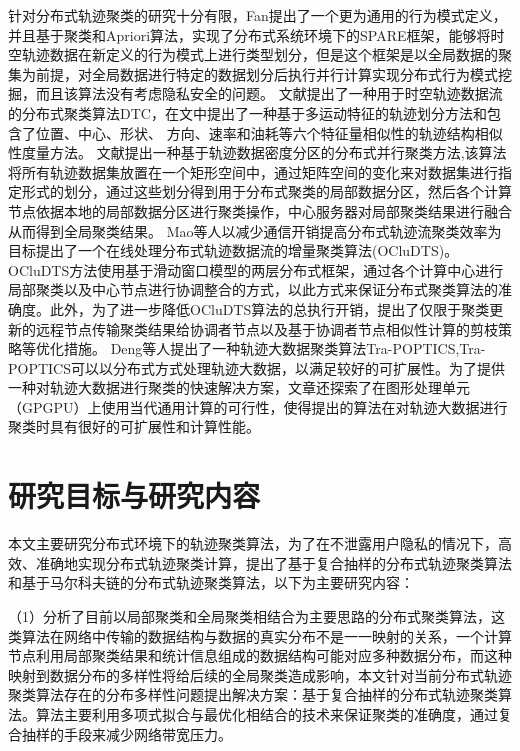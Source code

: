 针对分布式轨迹聚类的研究十分有限，Fan提出了一个更为通用的行为模式定义，并且基于聚类和Apriori算法，实现了分布式系统环境下的SPARE框架，能够将时空轨迹数据在新定义的行为模式上进行类型划分，但是这个框架是以全局数据的聚集为前提，对全局数据进行特定的数据划分后执行并行计算实现分布式行为模式挖掘，而且该算法没有考虑隐私安全的问题。
文献\cite{肖源分布式车辆时空轨迹异常检测算法研究}提出了一种用于时空轨迹数据流的分布式聚类算法DTC，在文中提出了一种基于多运动特征的轨迹划分方法和包含了位置、中心、形状、
方向、速率和油耗等六个特征量相似性的轨迹结构相似性度量方法。
文献\cite{Wang2018A}提出一种基于轨迹数据密度分区的分布式并行聚类方法,该算法将所有轨迹数据集放置在一个矩形空间中，通过矩阵空间的变化来对数据集进行指定形式的划分，通过这些划分得到用于分布式聚类的局部数据分区，然后各个计算节点依据本地的局部数据分区进行聚类操作，中心服务器对局部聚类结果进行融合从而得到全局聚类结果。
Mao等人以减少通信开销提高分布式轨迹流聚类效率为目标提出了一个在线处理分布式轨迹数据流的增量聚类算法(OCluDTS)。OCluDTS方法使用基于滑动窗口模型的两层分布式框架，通过各个计算中心进行局部聚类以及中心节点进行协调整合的方式，以此方式来保证分布式聚类算法的准确度。此外，为了进一步降低OCluDTS算法的总执行开销，提出了仅限于聚类更新的远程节点传输聚类结果给协调者节点以及基于协调者节点相似性计算的剪枝策略等优化措施。
Deng等人提出了一种轨迹大数据聚类算法Tra-POPTICS,Tra-POPTICS可以以分布式方式处理轨迹大数据，以满足较好的可扩展性。为了提供一种对轨迹大数据进行聚类的快速解决方案，文章还探索了在图形处理单元（GPGPU）上使用当代通用计算的可行性，使得提出的算法在对轨迹大数据进行聚类时具有很好的可扩展性和计算性能。


\section{研究目标与研究内容}

本文主要研究分布式环境下的轨迹聚类算法，为了在不泄露用户隐私的情况下，高效、准确地实现分布式轨迹聚类计算，提出了基于复合抽样的分布式轨迹聚类算法和基于马尔科夫链的分布式轨迹聚类算法，以下为主要研究内容：

（1）分析了目前以局部聚类和全局聚类相结合为主要思路的分布式聚类算法，这类算法在网络中传输的数据结构与数据的真实分布不是一一映射的关系，一个计算节点利用局部聚类结果和统计信息组成的数据结构可能对应多种数据分布，而这种映射到数据分布的多样性将给后续的全局聚类造成影响，本文针对当前分布式轨迹聚类算法存在的分布多样性问题提出解决方案：基于复合抽样的分布式轨迹聚类算法。算法主要利用多项式拟合与最优化相结合的技术来保证聚类的准确度，通过复合抽样的手段来减少网络带宽压力。

